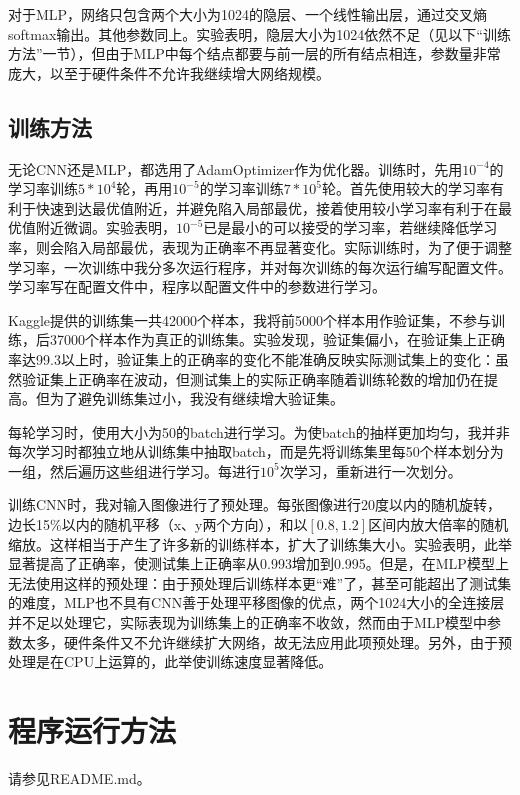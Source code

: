 \documentclass[UTF8]{ctexart}
\begin{document}
            对于MLP，网络只包含两个大小为1024的隐层、一个线性输出层，通过交叉熵softmax输出。其他参数同上。实验表明，隐层大小为1024依然不足（见以下“训练方法”一节），但由于MLP中每个结点都要与前一层的所有结点相连，参数量非常庞大，以至于硬件条件不允许我继续增大网络规模。

        \subsection{训练方法}
            无论CNN还是MLP，都选用了AdamOptimizer作为优化器。训练时，先用$10^{-4}$的学习率训练$5*10^4$轮，再用$10^{-5}$的学习率训练$7*10^5$轮。首先使用较大的学习率有利于快速到达最优值附近，并避免陷入局部最优，接着使用较小学习率有利于在最优值附近微调。实验表明，$10^{-5}$已是最小的可以接受的学习率，若继续降低学习率，则会陷入局部最优，表现为正确率不再显著变化。实际训练时，为了便于调整学习率，一次训练中我分多次运行程序，并对每次训练的每次运行编写配置文件。学习率写在配置文件中，程序以配置文件中的参数进行学习。

            Kaggle提供的训练集一共42000个样本，我将前5000个样本用作验证集，不参与训练，后37000个样本作为真正的训练集。实验发现，验证集偏小，在验证集上正确率达99.3以上时，验证集上的正确率的变化不能准确反映实际测试集上的变化：虽然验证集上正确率在波动，但测试集上的实际正确率随着训练轮数的增加仍在提高。但为了避免训练集过小，我没有继续增大验证集。

            每轮学习时，使用大小为50的batch进行学习。为使batch的抽样更加均匀，我并非每次学习时都独立地从训练集中抽取batch，而是先将训练集里每50个样本划分为一组，然后遍历这些组进行学习。每进行$10^5$次学习，重新进行一次划分。

            训练CNN时，我对输入图像进行了预处理。每张图像进行20度以内的随机旋转，边长15\%以内的随机平移（x、y两个方向），和以$[0.8,1.2]$区间内放大倍率的随机缩放。这样相当于产生了许多新的训练样本，扩大了训练集大小。实验表明，此举显著提高了正确率，使测试集上正确率从0.993增加到0.995。但是，在MLP模型上无法使用这样的预处理：由于预处理后训练样本更“难”了，甚至可能超出了测试集的难度，MLP也不具有CNN善于处理平移图像的优点，两个1024大小的全连接层并不足以处理它，实际表现为训练集上的正确率不收敛，然而由于MLP模型中参数太多，硬件条件又不允许继续扩大网络，故无法应用此项预处理。另外，由于预处理是在CPU上运算的，此举使训练速度显著降低。

    \section{程序运行方法}

        请参见README.md。
\end{document}
